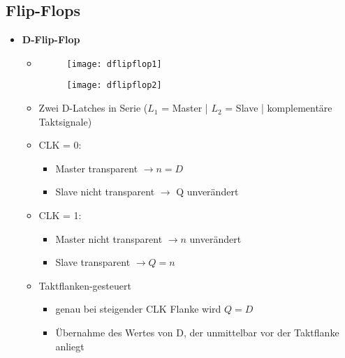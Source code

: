 \subsection{Flip-Flops}
\begin{itemize}

\item \textbf{D-Flip-Flop}
	\begin{itemize}
	\item[]		
				\begin{minipage}{0.25\textwidth}
					\begin{figure}[H]
					\texttt{[image: dflipflop1]}
					\end{figure}
				\end{minipage}
				\begin{minipage}[t]{0.6\textwidth}
					\vspace{-2.25cm}
					\begin{figure}[H]
					\texttt{[image: dflipflop2]}
					\end{figure}
				\end{minipage}
	\end{itemize}
	\begin{itemize}
	\item Zwei D-Latches in Serie ($L_1$ = Master | $L_2$ = Slave | komplementäre Taktsignale)
 	\item CLK = 0:
 		\vspace{-0.3cm}
 		\begin{itemize}
 		\item Master transparent $\rightarrow n = D$
 		\item Slave nicht transparent $\rightarrow$ Q unverändert
 		\end{itemize}
 	\item CLK = 1:
 		\vspace{-0.3cm}
 		\begin{itemize}
 		\item Master nicht transparent $\rightarrow n$ unverändert
 		\item Slave transparent $\rightarrow Q = n$
 		\end{itemize}
 	\item Taktflanken-gesteuert
 		\vspace{-0.3cm}
 		\begin{itemize}
 		\item genau bei steigender CLK Flanke wird $Q=D$
 		\item Übernahme des Wertes von D, der unmittelbar vor der Taktflanke anliegt
 		\end{itemize}
 	\end{itemize}
 	

\end{itemize}
